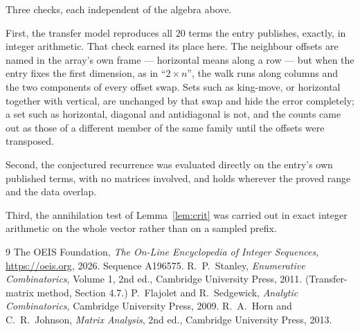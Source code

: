 \documentclass[11pt,a4paper]{article}
\theoremstyle{plain}
\theoremstyle{definition}
\begin{document}
Three checks, each independent of the algebra above.

First, the transfer model reproduces all $20$ terms the entry publishes, exactly, in
integer arithmetic. That check earned its place here. The neighbour offsets are named in the
array's own frame --- horizontal means along a row --- but when the entry fixes the first
dimension, as in ``$2\times n$'', the walk runs along columns and the two components of every
offset swap. Sets such as king-move, or horizontal together with vertical, are unchanged by
that swap and hide the error completely; a set such as horizontal, diagonal and antidiagonal
is not, and the counts came out as those of a different member of the same family until the
offsets were transposed.

Second, the conjectured recurrence was evaluated directly on the entry's own published terms,
with no matrices involved, and holds wherever the proved range and the data overlap.

Third, the annihilation test of Lemma~\ref{lem:crit} was carried out in exact integer
arithmetic on the whole vector rather than on a sampled prefix.

\begin{thebibliography}{9}
 The OEIS Foundation, \emph{The On-Line Encyclopedia of Integer
Sequences}, \url{https://oeis.org}, 2026. Sequence A196575.
 R.~P.~Stanley, \emph{Enumerative Combinatorics}, Volume 1, 2nd ed.,
Cambridge University Press, 2011. (Transfer-matrix method, Section 4.7.)
 P.~Flajolet and R.~Sedgewick, \emph{Analytic Combinatorics}, Cambridge
University Press, 2009.
 R.~A.~Horn and C.~R.~Johnson, \emph{Matrix Analysis}, 2nd ed., Cambridge
University Press, 2013.
\end{thebibliography}
\end{document}

